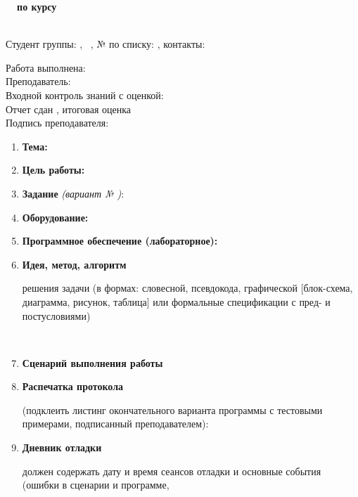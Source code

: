 \pagestyle{main}
\begin{large}
	\textbf{\DocName \ \Number \ по курсу \CourseName}
\end{large}	
\\
Студент группы: \Group, \ \Name, № по списку: \StudentNumber, контакты: \Contacts
\begin{flushright}
	Работа выполнена: \CompletionDate \\
	Преподаватель: \Lecturer \\
	Входной контроль знаний с оценкой: \\
	Отчет сдан \ReportDate, итоговая оценка \Mark \\
	Подпись преподавателя: \Signature
\end{flushright}
\begin{enumerate}
	\item \textbf{Тема:} \ \Theme
	\item \textbf{Цель работы: } \Target
	\item \textbf{Задание} \textit{(вариант № \StudentNumber)}: \Task
	\item \textbf{Оборудование:} \\ \Equipment
	\item \textbf{Программное обеспечение (лабораторное):} \\ \Software
	\item \textbf{Идея, метод, алгоритм} 
	\begin{footnotesize}
		решения задачи (в формах: словесной, псевдокода, графической [блок-схема, диаграмма, рисунок, таблица] или формальные спецификации с пред- и постусловиями)
	\end{footnotesize} \\ \Idea
	\item \textbf{Сценарий выполнения работы}
	\begin{footnotesize}
	\end{footnotesize}
	\Plan
	\item \textbf{Распечатка протокола}
	\begin{footnotesize}
		(подклеить листинг окончательного варианта программы с тестовыми примерами, подписанный
		преподавателем):
	\end{footnotesize}
	\Protocol
	\item \textbf{Дневник отладки} 
	\begin{footnotesize}
		должен содержать дату и время сеансов отладки и основные события (ошибки в сценарии и программе,

\end{footnotesize}
\end{enumerate}

